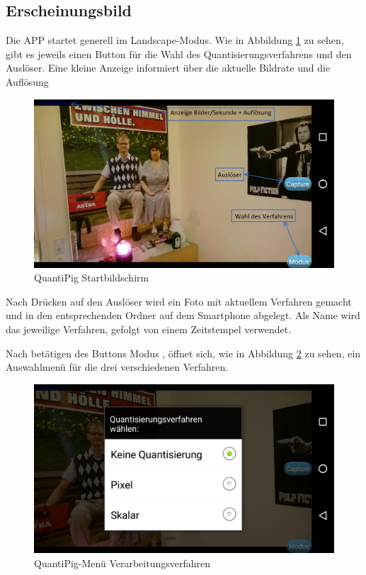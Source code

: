 \begin{description}
\newpage
\subsection{Erscheinungsbild}
Die APP startet generell im Landscape-Modus. Wie in Abbildung \ref{fig:pig_menue} zu sehen, gibt es jeweils einen Button für die Wahl des Quantisierungsverfahrens und den Auslöser. Eine kleine Anzeige informiert über die aktuelle Bildrate und die Auflösung

\begin{figure}[h]
	\centering
		\includegraphics[width=1.0\textwidth]{img/Startbildschirm_QuantiPig.png}
	\caption[QuantiPig Startbildschirm]{QuantiPig Startbildschirm}
	\label{fig:pig_menue}
\end{figure}

Nach Drücken auf den Auslöser wird ein Foto mit aktuellem Verfahren gemacht und in den entsprechenden Ordner auf dem Smartphone abgelegt. Als Name wird das jeweilige Verfahren, gefolgt von einem Zeitstempel verwendet.

Nach betätigen des Buttons \glqq
Modus\grqq
, öffnet sich, wie in Abbildung \ref{fig:pig_verfahren} zu sehen, ein Auswahlmenü für die drei verschiedenen Verfahren.

\begin{figure}[h!]
	\centering
		\includegraphics[width=1.0\textwidth]{img/Verfahren_QuantiPig.png}
	\caption[QuantiPig-Menü Verarbeitungsverfahren]{QuantiPig-Menü Verarbeitungsverfahren}
	\label{fig:pig_verfahren}
\end{figure}


\end{description}
